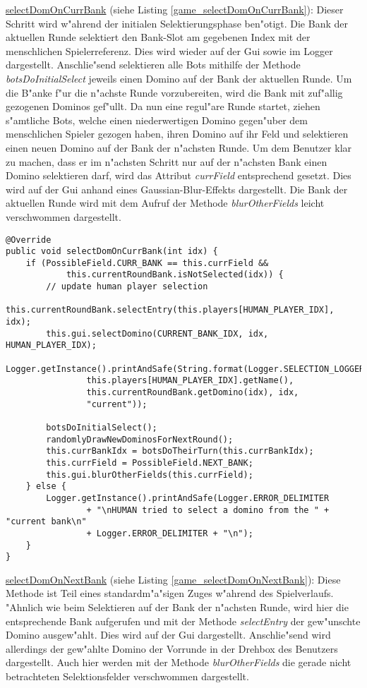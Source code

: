 \underline{selectDomOnCurrBank} (siehe Listing \ref{game_selectDomOnCurrBank}): Dieser Schritt wird w"ahrend der initialen Selektierungsphase ben"otigt. Die Bank der aktuellen Runde selektiert den Bank-Slot am gegebenen Index mit der menschlichen Spielerreferenz. Dies wird wieder auf der Gui sowie im Logger dargestellt. Anschlie"send selektieren alle Bots mithilfe der Methode \emph{botsDoInitialSelect} jeweils einen Domino auf der Bank der aktuellen Runde. Um die B"anke f"ur die n"achste Runde vorzubereiten, wird die Bank mit zuf"allig gezogenen Dominos gef"ullt. Da nun eine regul"are Runde startet, ziehen s"amtliche Bots, welche einen niederwertigen Domino gegen"uber dem menschlichen Spieler gezogen haben, ihren Domino auf ihr Feld und selektieren einen neuen Domino auf der Bank der n"achsten Runde. Um dem Benutzer klar zu machen, dass er im n"achsten Schritt nur auf der n"achsten Bank einen Domino selektieren darf, wird das Attribut \emph{currField} entsprechend gesetzt. Dies wird auf der Gui anhand eines Gaussian-Blur-Effekts dargestellt. Die Bank der aktuellen Runde wird mit dem Aufruf der Methode \emph{blurOtherFields} leicht verschwommen dargestellt. 

\begin{lstlisting}[float,style=CodeHighlighting,label=game_selectDomOnCurrBank,caption=Game - selectDomOnCurrBank]
@Override
public void selectDomOnCurrBank(int idx) {
    if (PossibleField.CURR_BANK == this.currField &&
    		this.currentRoundBank.isNotSelected(idx)) {
        // update human player selection
        this.currentRoundBank.selectEntry(this.players[HUMAN_PLAYER_IDX], idx);
        this.gui.selectDomino(CURRENT_BANK_IDX, idx, HUMAN_PLAYER_IDX);
        Logger.getInstance().printAndSafe(String.format(Logger.SELECTION_LOGGER_FORMAT,
                this.players[HUMAN_PLAYER_IDX].getName(),
                this.currentRoundBank.getDomino(idx), idx,
                "current"));

        botsDoInitialSelect();
        randomlyDrawNewDominosForNextRound();
        this.currBankIdx = botsDoTheirTurn(this.currBankIdx);
        this.currField = PossibleField.NEXT_BANK;
        this.gui.blurOtherFields(this.currField);
    } else {
        Logger.getInstance().printAndSafe(Logger.ERROR_DELIMITER
                + "\nHUMAN tried to select a domino from the " + "current bank\n" 
                + Logger.ERROR_DELIMITER + "\n");
    }
}
\end{lstlisting}

\underline{selectDomOnNextBank} (siehe Listing \ref{game_selectDomOnNextBank}): Diese Methode ist Teil eines standardm"a"sigen Zuges w"ahrend des Spielverlaufs. "Ahnlich wie beim Selektieren auf der Bank der n"achsten Runde, wird hier die entsprechende Bank aufgerufen und mit der Methode \emph{selectEntry} der gew"unschte Domino ausgew"ahlt. Dies wird auf der Gui dargestellt. Anschlie"send wird allerdings der gew"ahlte Domino der Vorrunde in der Drehbox des Benutzers dargestellt. Auch hier werden mit der Methode \emph{blurOtherFields} die gerade nicht betrachteten Selektionsfelder verschwommen dargestellt. 

